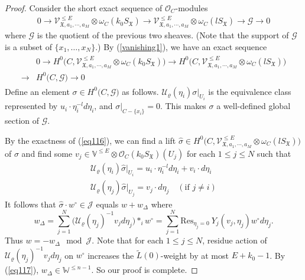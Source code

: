 \documentclass[11pt,b5paper,notitlepage]{article}
\theoremstyle{definition}
\theoremstyle{plain}
\newcommand{\mc}{\mathcal}
\newcommand{\wtd}{\widetilde}
\newcommand{\wht}{\widehat}
\newcommand{\Res}{\mathrm{Res}}
\newcommand{\SV}{\mathscr{V}}
\newcommand{\scr}{\mathscr}
\newcommand{\Vbb}{\mathbb V}
\newcommand{\Wbb}{\mathbb W}
\newcommand{\<}{\left\langle}
\renewcommand{\>}{\right\rangle}
\newcommand{\MO}{\mathcal{O}}
\newcommand{\MU}{\mathcal{U}}
\newcommand{\fx}{\mathfrak{X}}
\newcommand{\SJ}{\mathscr{J}}
\numberwithin{equation}{subsection}
\begin{document}
\begin{proof}
Consider the short exact sequence of $\MO_C$-modules
\begin{gather}
    0\rightarrow \SV_{\fx,a_1,\cdots,a_M}^{\leq E}\otimes \omega_C(k_0S_\fx)\rightarrow \SV_{\fx,a_1,\cdots,a_M}^{\leq E} \otimes \omega_C(lS_\fx)\rightarrow \mathscr{G}\rightarrow 0
\end{gather}
    where $\mathscr{G}$ is the quotient of the previous two sheaves. (Note that the support of $\scr G$ is a subset of $\{x_1,\dots,x_N\}$.) By (\ref{vanishing1}), we have an exact sequence
\begin{align}\label{eq116}
\begin{aligned}
&0\rightarrow H^0\big(C,\SV_{\fx,a_1,\cdots,a_M}^{\leq E}\otimes \omega_C(k_0S_\fx)\big)\rightarrow H^0\big(C,\SV_{\fx,a_1,\cdots,a_M}^{\leq E} \otimes \omega_C(lS_\fx)\big)\\
\rightarrow & H^0\big(C,\mathscr{G}\big)\rightarrow 0
\end{aligned}
\end{align}
Define an element $\sigma\in H^0\big(C,\mathscr{G}\big)$ as follows. $\mc U_\varrho(\eta_i)\sigma\vert_{U_i}$ is the equivalence class represented by $u_i\cdot \eta_i^{-l}d\eta_i$, and $\sigma\vert_{C-\{x_i\}}=0$. This makes $\sigma$ a well-defined global section of $\scr G$. 




     
By the exactness of (\ref{eq116}), we can find a lift $\wht{\sigma}\in H^0\big(C,\SV_{\fx,a_1,\cdots,a_M}^{\leq E} \otimes \omega_C(lS_\fx)\big)$ of $\sigma$ and find some $v_j\in \Vbb^{\leq E}\otimes \MO_C(k_0S_\fx)(U_j)$ for each $1\leq j\leq N$ such that
\begin{subequations}
\begin{gather}
        \mc U_\varrho(\eta_i)\wht{\sigma}\vert_{U_i}=u_i\cdot \eta_i^{-l}d\eta_i+v_i\cdot d\eta_i\\
        \mc U_\varrho(\eta_j)\wht{\sigma}\vert_{U_j}=v_j\cdot d\eta_j\quad (\text{if }j\ne i)
\end{gather}
\end{subequations}
It follows that $\wht{\sigma}\cdot w^\circ\in \SJ$ equals $w+w_\Delta$ where 
    $$
    w_\Delta=\sum_{j=1}^N \big(\mc U_\varrho(\eta_j)^{-1}v_jd\eta_j\big)*_i w^\circ=\sum_{j=1}^N\Res_{\eta_j=0}~ Y_j(v_j,\eta_j)w^\circ d\eta_j.
    $$
    Thus $w=-w_\Delta\mod \SJ$. Note that for each $1\leq j\leq N$, residue action of $\mc U_\varrho(\eta_j)^{-1}v_jd\eta_j$ on $w^\circ$ increases the $\wtd L(0)$-weight by at most $E+k_0-1$. By (\ref{eq117}), $w_\Delta\in \Wbb^{\leq n-1}$. So our proof is complete.
\end{proof}
\end{document}
